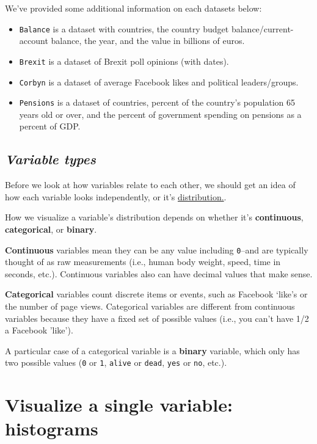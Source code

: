 \documentclass[letterpaper,12pt,twoside,]{pinp}
\begin{document}
We've provided some additional information on each datasets below:

\begin{itemize}
\item
  \texttt{Balance} is a dataset with countries, the country budget
  balance/current-account balance, the year, and the value in billions
  of euros.
\item
  \texttt{Brexit} is a dataset of Brexit poll opinions (with dates).
\item
  \texttt{Corbyn} is a dataset of average Facebook likes and political
  leaders/groups.
\item
  \texttt{Pensions} is a dataset of countries, percent of the country's
  population 65 years old or over, and the percent of government
  spending on pensions as a percent of GDP.
\end{itemize}

\hypertarget{variable-types}{%
\subsection{\texorpdfstring{\textbf{\emph{Variable
types}}}{Variable types}}\label{variable-types}}

Before we look at how variables relate to each other, we should get an
idea of how each variable looks independently, or it's
\href{https://en.wikipedia.org/wiki/List_of_probability_distributions}{distribution.}.

How we visualize a variable's distribution depends on whether it's
\textbf{continuous}, \textbf{categorical}, or \textbf{binary}.

\textbf{Continuous} variables mean they can be any value including
\texttt{0}--and are typically thought of as raw measurements (i.e.,
human body weight, speed, time in seconds, etc.). Continuous variables
also can have decimal values that make sense.

\textbf{Categorical} variables count discrete items or events, such as
Facebook `like's or the number of page views. Categorical variables are
different from continuous variables because they have a fixed set of
possible values (i.e., you can't have 1/2 a Facebook 'like').

A particular case of a categorical variable is a \textbf{binary}
variable, which only has two possible values (\texttt{0} or \texttt{1},
\texttt{alive} or \texttt{dead}, \texttt{yes} or \texttt{no}, etc.).

\hypertarget{visualize-a-single-variable-histograms}{%
\section{Visualize a single variable:
histograms}\label{visualize-a-single-variable-histograms}}
\end{document}
